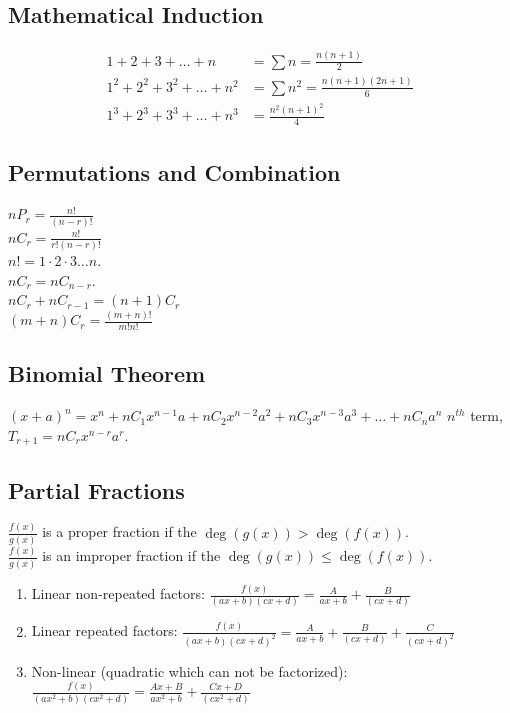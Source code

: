\documentclass{article}
\begin{document}
\subsection*{Mathematical Induction}
\begin{align*}
1+2+3+\dots+n &= \sum n = \frac{n(n+1)}{2} \\
1^{2}+2^{2}+3^{2}+\dots+n^{2} &= \sum n^{2} = \frac{n(n+1)(2n+1)}{6} \\
1^{3}+2^{3}+3^{3}+\dots+n^{3} &= \frac{n^{2}(n+1)^{2}}{4}
\end{align*}

\subsection*{Permutations and Combination}
$n P_{r} = \frac{n!}{(n-r)!}$\\
$nC_{r}=\frac{n!}{r!(n-r)!}$\\
$n!=1 \cdot 2 \cdot 3 \dots n.$\\
$nC_{r}=nC_{n-r}.$\\
$nC_{r}+nC_{r-1}=(n+1)C_{r}$\\
$(m+n)C_{r}=\frac{(m+n)!}{m!n!}$\\

\subsection*{Binomial Theorem}
$(x+a)^{n}=x^{n}+nC_{1}x^{n-1}a+nC_{2}x^{n-2}a^{2}+nC_{3}x^{n-3}a^{3}+\dots+nC_{n}a^{n}$
$n^{th}$ term, $T_{r+1}=nC_{r}x^{n-r}a^{r}$.

\subsection*{Partial Fractions}
$\frac{f(x)}{g(x)}$ is a proper fraction if the $\deg(g(x))>\deg(f(x))$.
\\$\frac{f(x)}{g(x)}$ is an improper fraction if the $\deg(g(x))\le \deg(f(x)).$
\begin{enumerate}
\item Linear non-repeated factors:
$\frac{f(x)}{(ax+b)(cx+d)}=\frac{A}{ax+b}+\frac{B}{(cx+d)}$
\item Linear repeated factors:
$\frac{f(x)}{(ax+b)(cx+d)^{2}}=\frac{A}{ax+b}+\frac{B}{(cx+d)}+\frac{C}{(cx+d)^{2}}$
\item Non-linear (quadratic which can not be factorized):
$\frac{f(x)}{(ax^{2}+b)(cx^{2}+d)}=\frac{Ax+B}{ax^{2}+b}+\frac{Cx+D}{(cx^{2}+d)}$
\end{enumerate}
\end{document}
